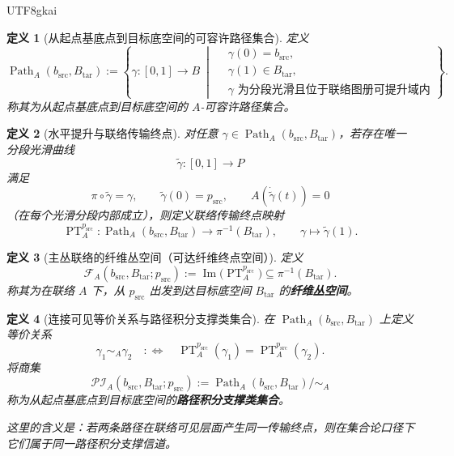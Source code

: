 \documentclass[12pt]{article}
\newtheorem{definition}{定义}[section]
\newcommand{\Path}{\operatorname{Path}}
\newcommand{\PT}{\operatorname{PT}}
\newcommand{\Img}{\operatorname{Im}}
\begin{document}
\begin{CJK*}{UTF8}{gkai}
\begin{definition}[从起点基底点到目标底空间的可容许路径集合]
定义
\[
  \Path_A(b_{\mathrm{src}},B_{\mathrm{tar}})
  :=
  \left\{
    \gamma:[0,1]\to B\
    \middle|\
    \begin{aligned}
      &\gamma(0)=b_{\mathrm{src}},\\
      &\gamma(1)\in B_{\mathrm{tar}},\\
      &\gamma\text{ 为分段光滑且位于联络图册可提升域内}
    \end{aligned}
  \right\}.
\]
称其为从起点基底点到目标底空间的 $A$-可容许路径集合。
\end{definition}

\begin{definition}[水平提升与联络传输终点]
对任意 $\gamma\in \Path_A(b_{\mathrm{src}},B_{\mathrm{tar}})$，若存在唯一分段光滑曲线
\[
  \widetilde{\gamma}:[0,1]\to P
\]
满足
\[
  \pi\circ \widetilde{\gamma}=\gamma,\qquad
  \widetilde{\gamma}(0)=p_{\mathrm{src}},\qquad
  A(\dot{\widetilde{\gamma}}(t))=0
\]
（在每个光滑分段内部成立），则定义联络传输终点映射
\[
  \PT_A^{p_{\mathrm{src}}}:\Path_A(b_{\mathrm{src}},B_{\mathrm{tar}})
  \to \pi^{-1}(B_{\mathrm{tar}}),
  \qquad
  \gamma\mapsto \widetilde{\gamma}(1).
\]
\end{definition}

\begin{definition}[主丛联络的纤维丛空间（可达纤维终点空间）]
定义
\[
  \mathcal{F}_{A}(b_{\mathrm{src}},B_{\mathrm{tar}};p_{\mathrm{src}})
  :=
  \Img\!\bigl(\PT_A^{p_{\mathrm{src}}}\bigr)
  \subseteq \pi^{-1}(B_{\mathrm{tar}}).
\]
称其为在联络 $A$ 下，从 $p_{\mathrm{src}}$ 出发到达目标底空间 $B_{\mathrm{tar}}$ 的\textbf{纤维丛空间}。
\end{definition}

\begin{definition}[连接可见等价关系与路径积分支撑类集合]
\label{def:tex36-pi-set}
在 $\Path_A(b_{\mathrm{src}},B_{\mathrm{tar}})$ 上定义等价关系
\[
  \gamma_1\sim_A \gamma_2
  \quad:\Longleftrightarrow\quad
  \PT_A^{p_{\mathrm{src}}}(\gamma_1)=\PT_A^{p_{\mathrm{src}}}(\gamma_2).
\]
将商集
\[
  \mathcal{PI}_{A}(b_{\mathrm{src}},B_{\mathrm{tar}};p_{\mathrm{src}})
  :=
  \Path_A(b_{\mathrm{src}},B_{\mathrm{tar}})\big/\sim_A
\]
称为从起点基底点到目标底空间的\textbf{路径积分支撑类集合}。

这里的含义是：若两条路径在联络可见层面产生同一传输终点，则在集合论口径下它们属于同一路径积分支撑信道。
\end{definition}


\end{CJK*}
\end{document}
